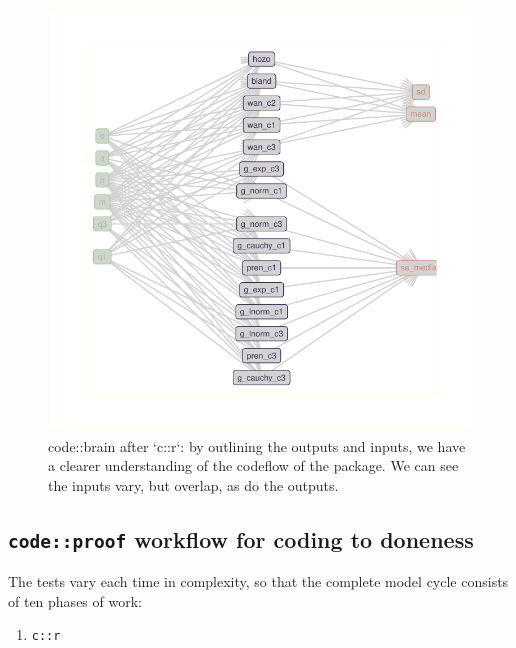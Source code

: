 \documentclass[
]{article}
\providecommand{\tightlist}{%
  \setlength{\itemsep}{0pt}\setlength{\parskip}{0pt}}
\begin{document}
\begin{figure}

{\centering \includegraphics{when-is-done-done_files/figure-latex/codebraingood-1} 

}

\caption{code::brain after `c::r`: by outlining the outputs and inputs, we have a clearer understanding of the codeflow of the package. We can see the inputs vary, but overlap, as do the outputs.}\label{fig:codebraingood}
\end{figure}

\hypertarget{codeproof-workflow-for-coding-to-doneness}{%
\subsection{\texorpdfstring{\texttt{code::proof} workflow for coding to doneness}{code::proof workflow for coding to doneness}}\label{codeproof-workflow-for-coding-to-doneness}}

The tests vary each time in complexity, so that the complete model cycle consists of ten phases of work:

\begin{enumerate}
\def\labelenumi{\arabic{enumi}.}
\tightlist
\item
  \texttt{c::r}
\end{enumerate}
\end{document}
